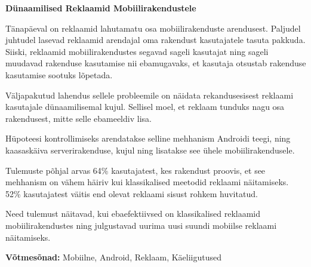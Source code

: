 \begin{abstracts}

\textbf{D\"{u}naamilised Reklaamid Mobiilirakendustele}

T\"{a}nap\"{a}eval on reklaamid lahutamatu osa mobiilirakenduste arendusest. Paljudel juhtudel lasevad reklaamid arendajal oma rakendust kasutajatele tasuta pakkuda. Siiski, reklaamid mobiilirakendustes segavad sageli kasutajat ning sageli muudavad rakenduse kasutamise nii ebamugavaks, et kasutaja otsustab rakenduse kasutamise sootuks l\~{o}petada.

V\"{a}ljapakutud lahendus sellele probleemile on n\"{a}idata rekandusesisest reklaami kasutajale d\"{u}naamilisemal kujul. Sellisel moel, et reklaam tunduks nagu osa rakendusest, mitte selle ebameeldiv lisa.

H\"{u}poteesi kontrollimiseks arendatakse selline mehhanism Androidi teegi, ning kaasask\"{a}iva serverirakenduse, kujul ning lisatakse see \"{u}hele mobiilirakendusele.

Tulemuste p\~{o}hjal arvas 64\% kasutajatest, kes rakendust proovis, et see mehhanism on v\"{a}hem h\"{a}iriv kui klassikalised meetodid reklaami n\"{a}itamiseks. 52\% kasutajatest v\"{a}itis end olevat reklaami sisust rohkem huvitatud.

Need tulemust n\"{a}itavad, kui ebaefektiivsed on klassikalised reklaamid mobiilirakendustes ning julgustavad uurima uusi suundi mobiilse reklaami n\"{a}itamiseks.

\bigskip

\textbf{V\~{o}tmes\~{o}nad:} Mobiilne, Android, Reklaam, K\"{a}eliigutused

\end{abstracts}